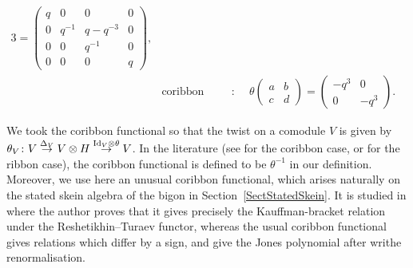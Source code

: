 \documentclass[pdftex]{sigma}%
\numberwithin{equation}{section}
\begin{document}
\begin{Definition}
\begin{alignat*}{3}
=\begin{pmatrix} q& 0 & 0 & 0\\ 0 & q^{-1} & q-q^{-3} & 0\\ 0 & 0 & q^{-1}&0\\ 0 & 0 & 0 & q \end{pmatrix}\!,&
\\
& \text{coribbon functional}\colon \quad && \theta \begin{pmatrix} a & b \\[-.5ex] c & d \end{pmatrix}
= \begin{pmatrix} -q^3 & 0 \\[-.5ex] 0 & -q^3 \end{pmatrix}\!.&
\end{alignat*}
\end{Definition}

\begin{Remark}
We took the coribbon functional so that the twist on a comodule $V$ is given by $\theta_V\colon V \overset{\Delta_V}{\to} V \otimes H \overset{{\rm Id}_V \otimes \theta}{\to} V$. In the literature (see \cite{Wakui} for the coribbon case, or \cite{Kassel} for the ribbon case), the coribbon functional is defined to be $\theta^{-1}$ in our definition.
Moreover, we use here an unusual coribbon functional, which arises naturally on the stated skein algebra of the bigon in Section~\ref{SectStatedSkein}. It is studied in \cite{Tingley} where the author proves that it gives precisely the Kauffman-bracket relation under the Reshetikhin--Turaev functor, whereas the usual coribbon functional gives relations which differ by a sign, and give the Jones polynomial after writhe renormalisation.
\end{Remark}
\end{document}
